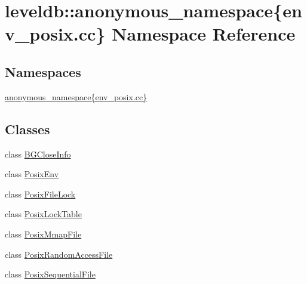 \hypertarget{namespaceleveldb_1_1anonymous__namespace_02env__posix_8cc_03}{}\section{leveldb\+:\+:anonymous\+\_\+namespace\{env\+\_\+posix.\+cc\} Namespace Reference}
\label{namespaceleveldb_1_1anonymous__namespace_02env__posix_8cc_03}
\subsection*{Namespaces}
\begin{DoxyCompactItemize}
\item 
 \hyperlink{namespaceleveldb_1_1anonymous__namespace_02env__posix_8cc_03_1_1anonymous__namespace_02env__posix_8cc_03}{anonymous\+\_\+namespace\{env\+\_\+posix.\+cc\}}
\end{DoxyCompactItemize}
\subsection*{Classes}
\begin{DoxyCompactItemize}
\item 
class \hyperlink{classleveldb_1_1anonymous__namespace_02env__posix_8cc_03_1_1_b_g_close_info}{B\+G\+Close\+Info}
\item 
class \hyperlink{classleveldb_1_1anonymous__namespace_02env__posix_8cc_03_1_1_posix_env}{Posix\+Env}
\item 
class \hyperlink{classleveldb_1_1anonymous__namespace_02env__posix_8cc_03_1_1_posix_file_lock}{Posix\+File\+Lock}
\item 
class \hyperlink{classleveldb_1_1anonymous__namespace_02env__posix_8cc_03_1_1_posix_lock_table}{Posix\+Lock\+Table}
\item 
class \hyperlink{classleveldb_1_1anonymous__namespace_02env__posix_8cc_03_1_1_posix_mmap_file}{Posix\+Mmap\+File}
\item 
class \hyperlink{classleveldb_1_1anonymous__namespace_02env__posix_8cc_03_1_1_posix_random_access_file}{Posix\+Random\+Access\+File}
\item 
class \hyperlink{classleveldb_1_1anonymous__namespace_02env__posix_8cc_03_1_1_posix_sequential_file}{Posix\+Sequential\+File}
\end{DoxyCompactItemize}
